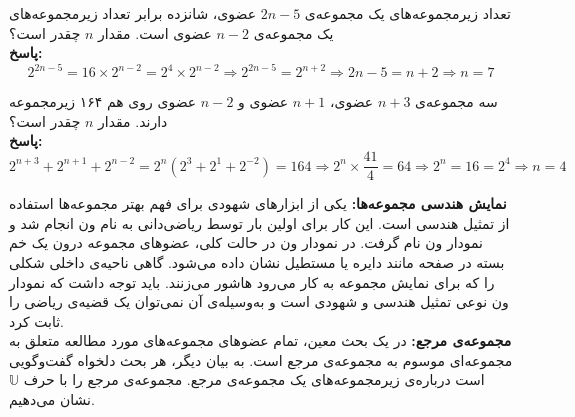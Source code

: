 \begin{example}
	تعداد زیرمجموعه‌های یک مجموعه‌ی
	$2n-5$
	عضوی، شانزده برابر تعداد زیرمجموعه‌های یک مجموعه‌ی
	$n-2$
	عضوی است. مقدار $n$ چقدر است؟
	\\ \textbf{پاسخ:}
	$$2^{2n-5} = 16 \times 2^{n-2} = 2^4 \times 2^{n-2} \Rightarrow 2^{2n-5} = 2^{n+2} \Rightarrow 2n-5=n+2 \Rightarrow n=7$$
\end{example}
\begin{example}
	سه مجموعه‌ی
	$n+3$
	عضوی،
	$n+1$
	عضوی و
	$n-2$
	عضوی روی هم ۱۶۴ زیرمجموعه دارند. مقدار $n$ چقدر است؟
	\\ \textbf{پاسخ:}
	$$2^{n+3} + 2^{n+1} + 2^{n-2} = 2^n(2^3+2^1+2^{-2}) = 164 \Rightarrow 2^n \times \frac{41}{4} = 64 \Rightarrow 2^n = 16 = 2^4 \Rightarrow n=4$$
\end{example}
\smallskip
\textbf{نمایش هندسی مجموعه‌ها:}
یکی از ابزارهای شهودی برای فهم بهتر مجموعه‌ها استفاده از تمثیل هندسی است. این کار برای اولین بار توسط ریاضی‌دانی به نام ون%
انجام شد و نمودار ون نام گرفت. در نمودار ون در حالت کلی، عضوهای مجموعه درون یک خم بسته در صفحه مانند دایره یا مستطیل نشان داده می‌شود. گاهی ناحیه‌ی داخلی شکلی را که برای نمایش مجموعه به کار می‌رود هاشور می‌زنند. باید توجه داشت که نمودار ون نوعی تمثیل هندسی و شهودی است و به‌وسیله‌ی آن نمی‌توان یک قضیه‌ی ریاضی را ثابت کرد.
\\
\textbf{مجموعه‌ی مرجع:}
در یک بحث معین، تمام عضوهای مجموعه‌های مورد مطالعه متعلق به مجموعه‌ای موسوم به مجموعه‌ی مرجع است. به بیان دیگر، هر بحث دلخواه گفت‌وگویی است درباره‌ی زیرمجموعه‌های یک مجموعه‌ی مرجع. مجموعه‌ی مرجع را با حرف
$\mathbb{U}$
نشان می‌دهیم.

